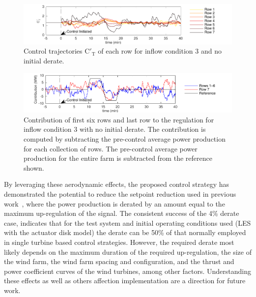 \begin{figure}[h]
\begin{center}
\includegraphics[width=\textwidth]{./fig/Ctp.pdf}
\caption{Control trajectories $\text{C}'_\text{T}$ of each row for inflow condition 3 and no initial derate.}
\label{fig:Ctp}
\end{center}
\end{figure}

\begin{figure}[b]
\begin{center}
\includegraphics[width=\textwidth]{./fig/Pcont.pdf}
\caption{Contribution of first six rows and last row to the regulation for inflow condition 3 with no initial derate. The contribution is computed by subtracting the pre-control average power production for each collection of rows. The pre-control average power production for the entire farm is subtracted from the reference shown.}
\label{fig:P_contribution}
\end{center}
\end{figure}

By leveraging these aerodynamic effects, the proposed control strategy has demonstrated the potential to reduce the setpoint reduction used in previous work~\cite{Aho2013a, Aho2014a, Jeong2014a}, where the power production is derated by an amount equal to the maximum up-regulation of the signal. The consistent success of the 4\% derate case, indicates that for the test system and initial operating conditions used (LES with the actuator disk model) the derate can be 50\% of that normally employed in single turbine based control strategies. However, the required derate most likely depends on the maximum duration of the required up-regulation, the size of the wind farm, the wind farm spacing and configuration, and the thrust and power coefficient curves of the wind turbines, among other factors. Understanding these effects as well as others affection implementation are a direction for future work.

